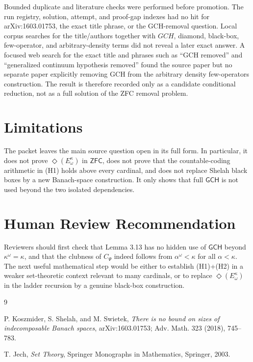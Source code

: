 \documentclass[11pt]{article}
\newcommand{\GCH}{\mathsf{GCH}}
\newcommand{\ZFC}{\mathsf{ZFC}}
\newcommand{\DiamondE}{\Diamond(E^\kappa_\omega)}
\begin{document}
Bounded duplicate and literature checks were performed before promotion.  The
run registry, solution, attempt, and proof-gap indexes had no hit for
arXiv:1603.01753, the exact title phrase, or the GCH-removal question.  Local
corpus searches for the title/authors together with \(GCH\), diamond,
black-box, few-operator, and arbitrary-density terms did not reveal a later
exact answer.  A focused web search for the exact title and phrases such as
``GCH removed'' and ``generalized continuum hypothesis removed'' found the
source paper but no separate paper explicitly removing GCH from the arbitrary
density few-operators construction.  The result is therefore recorded only as
a candidate conditional reduction, not as a full solution of the ZFC removal
problem.

\section*{Limitations}

The packet leaves the main source question open in its full form.  In
particular, it does not prove \(\DiamondE\) in \(\ZFC\), does not prove that
the countable-coding arithmetic in (H1) holds above every cardinal, and does
not replace Shelah black boxes by a new Banach-space construction.  It only
shows that full \(\GCH\) is not used beyond the two isolated dependencies.

\section*{Human Review Recommendation}

Reviewers should first check that Lemma 3.13 has no hidden use of
\(\GCH\) beyond \(\kappa^\omega=\kappa\), and that the clubness of \(C_\Psi\)
indeed follows from \(\alpha^\omega<\kappa\) for all \(\alpha<\kappa\).
The next useful mathematical step would be either to establish (H1)+(H2) in a
weaker set-theoretic context relevant to many cardinals, or to replace
\(\DiamondE\) in the ladder recursion by a genuine black-box construction.

\begin{thebibliography}{9}

P. Koszmider, S. Shelah, and M. Swietek,
\emph{There is no bound on sizes of indecomposable Banach spaces},
arXiv:1603.01753; Adv. Math. 323 (2018), 745--783.

T. Jech,
\emph{Set Theory},
Springer Monographs in Mathematics, Springer, 2003.

\end{thebibliography}
\end{document}
